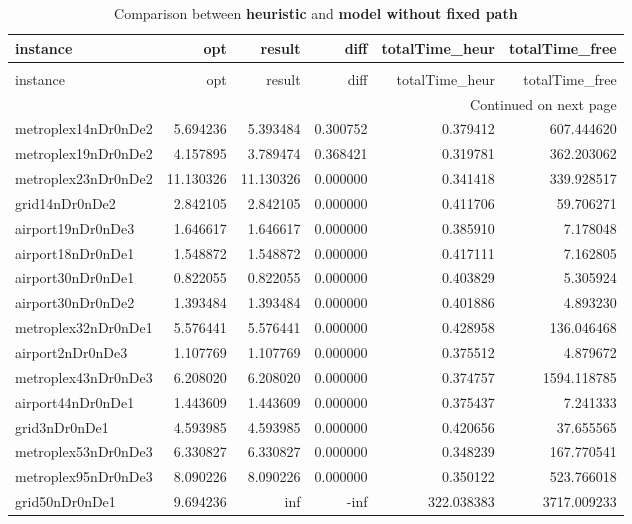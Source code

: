 
\begin{longtable}{|l|r|r|r|r|r|}
\caption{Comparison between \textbf{heuristic} and \textbf{model without fixed path} } \label{table:heuristic:compare} \\
\toprule
instance & opt & result & diff & totalTime_heur & totalTime_free \\
\midrule
\endfirsthead
\caption[]{Comparison between \textbf{heuristic} and \textbf{model without fixed path} } \\
\toprule
instance & opt & result & diff & totalTime_heur & totalTime_free \\
\midrule
\endhead
\midrule
\multicolumn{6}{r}{Continued on next page} \\
\midrule
\endfoot
\bottomrule
\endlastfoot
metroplex14nDr0nDe2 & 5.694236 & 5.393484 & 0.300752 & 0.379412 & 607.444620 \\
metroplex19nDr0nDe2 & 4.157895 & 3.789474 & 0.368421 & 0.319781 & 362.203062 \\
metroplex23nDr0nDe2 & 11.130326 & 11.130326 & 0.000000 & 0.341418 & 339.928517 \\
grid14nDr0nDe2 & 2.842105 & 2.842105 & 0.000000 & 0.411706 & 59.706271 \\
airport19nDr0nDe3 & 1.646617 & 1.646617 & 0.000000 & 0.385910 & 7.178048 \\
airport18nDr0nDe1 & 1.548872 & 1.548872 & 0.000000 & 0.417111 & 7.162805 \\
airport30nDr0nDe1 & 0.822055 & 0.822055 & 0.000000 & 0.403829 & 5.305924 \\
airport30nDr0nDe2 & 1.393484 & 1.393484 & 0.000000 & 0.401886 & 4.893230 \\
metroplex32nDr0nDe1 & 5.576441 & 5.576441 & 0.000000 & 0.428958 & 136.046468 \\
airport2nDr0nDe3 & 1.107769 & 1.107769 & 0.000000 & 0.375512 & 4.879672 \\
metroplex43nDr0nDe3 & 6.208020 & 6.208020 & 0.000000 & 0.374757 & 1594.118785 \\
airport44nDr0nDe1 & 1.443609 & 1.443609 & 0.000000 & 0.375437 & 7.241333 \\
grid3nDr0nDe1 & 4.593985 & 4.593985 & 0.000000 & 0.420656 & 37.655565 \\
metroplex53nDr0nDe3 & 6.330827 & 6.330827 & 0.000000 & 0.348239 & 167.770541 \\
metroplex95nDr0nDe3 & 8.090226 & 8.090226 & 0.000000 & 0.350122 & 523.766018 \\
grid50nDr0nDe1 & 9.694236 & inf & -inf & 322.038383 & 3717.009233 \\

\end{longtable}

